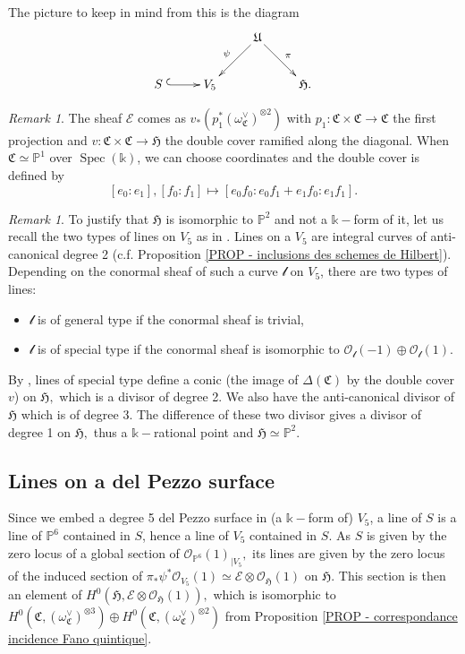 \documentclass{amsart}
\theoremstyle{plain}%
\theoremstyle{remark}
\newtheorem{rmq}[subsubsection]{Remark}
\theoremstyle{definition}
\newcommand{\cE}{\mathcal{E}}
\newcommand{\cml}{\mathcal l}
\newcommand{\cO}{\mathcal{O}}
\newcommand{\ek}{\mathbb{k}}
\newcommand{\eP}{\mathbb{P}}
\newcommand{\fC}{\mathfrak{C}}
\newcommand{\fH}{\mathfrak{H}}
\newcommand{\fU}{\mathfrak{U}}
\newcommand{\Spec}[1]{\operatorname{Spec}\left(#1\right)}
\newcommand{\rest}[2]{{#1}_{\mid #2}}
\begin{document}
The picture to keep in mind from this is the diagram
\begin{align}\label{EQU - diagramme incidence Fano}
    \xymatrix{&&\fU\ar[ld]_\psi \ar[rd]^\pi & \\ S \hspace{0.1cm}\ar@{^{(}->}[r] & V_5&&\fH.}
\end{align}

\begin{rmq}\label{RMQ - description de E}
The sheaf $\cE$ comes as $v_\ast( p_1^\ast (\omega_\fC^\vee)^{\otimes 2})$ with $p_1 : \fC \times \fC \to \fC$ the first projection and $v : \fC \times \fC \to \fH$ the double cover ramified along the diagonal. When $\fC \simeq \eP^1$ over $\Spec{\ek}$, we can choose coordinates and the double cover is defined by 
\[[e_0:e_1],[f_0:f_1] \mapsto [e_0f_0: e_0f_1 + e_1f_0 : e_1f_1].\]
\end{rmq}

\begin{rmq}
To justify that $\fH$ is isomorphic to $\eP^2$ and not a $\ek-$form of it, let us recall the two types of lines on $V_5$ as in \cite[Paragraph 1.1.1]{DFK25_fano22}. Lines on a $V_5$ are integral curves of anti-canonical degree 2 (c.f. Proposition \ref{PROP - inclusions des schemes de Hilbert}). Depending on the conormal sheaf of such a curve $\cml$ on $V_5$, there are two types of lines:
\begin{itemize}
    \item $\cml$ is of general type if the conormal sheaf is trivial,
    \item $\cml$ is of special type if the conormal sheaf is isomorphic to $\cO_\cml(-1)\oplus \cO_\cml(1).$
\end{itemize}
By \cite[Proposition 2]{DFK25_fano22}, lines of special type define a conic (the image of $\Delta(\fC)$ by the double cover $v$) on $\fH,$ which is a divisor of degree 2. We also have the anti-canonical divisor of $\fH$ which is of degree 3. The difference of these two divisor gives a divisor of degree 1 on $\fH,$ thus a $\ek-$rational point and $\fH \simeq \eP^2.$
\end{rmq}

\subsection{Lines on a del Pezzo surface}
Since we embed a degree 5 del Pezzo surface in (a $\ek-$form of) $V_5$, a line of $S$ is a line of $\eP^6$ contained in $S$, hence a line of $V_5$ contained in $S$. As $S$ is given by the zero locus of a global section of $\rest{\cO_{\eP^6}(1)}{V_5},$ its lines are given by the zero locus of the induced section of $\pi_\ast\psi^\ast\cO_{V_5}(1) \simeq \cE\otimes \cO_\fH(1)$ on $\fH$. This section is then an element of $H^0(\fH,\cE\otimes \cO_\fH(1)),$ which is isomorphic to $H^0(\fC,(\omega_\fC^\vee)^{\otimes 3}) \oplus H^0(\fC,(\omega_\fC^\vee)^{\otimes 2})$ from Proposition \ref{PROP - correspondance incidence Fano quintique}.
\end{document}
